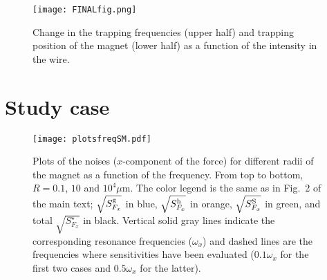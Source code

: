 \documentclass[twocolumn,superscriptaddress,floatfix,preprintnumbers,prl]{revtex4}
\begin{document}
\begin{figure}[t]
\begin{center}
\texttt{[image: FINALfig.png]}
\caption{Change in the trapping frequencies (upper half) and trapping position of the magnet (lower half) as a function of the intensity in the wire.}
\label{eq.fe}
\end{center}
\end{figure}


\section{Study case}

\begin{figure}[b]
\begin{center}
\texttt{[image: plotsfreqSM.pdf]}
\caption{Plots of the noises ($x$-component of the force) for different radii of the magnet as a function of the frequency. From top to bottom, $R=0.1$, $10$ and $10^4\mu$m. The color legend is the same as in Fig.~2 of the main text; $\sqrt{S_{F_x}^{\rm g}}$ in blue, $\sqrt{S_{F_x}^{\rm h}}$ in orange, $\sqrt{S_{F_x}^{\rm S}}$ in green, and total $\sqrt{S^{\star}_{F_x}}$ in black. Vertical solid gray lines indicate the corresponding resonance frequencies ($\omega_x$) and dashed lines are the frequencies where sensitivities have been evaluated ($0.1\omega_x$ for the first two cases and $0.5\omega_x$ for the latter).}
\label{plots.fre}
\end{center}
\end{figure}
\end{document}
